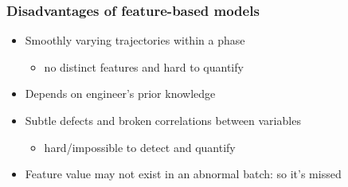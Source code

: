 \begin{frame}\frametitle{Disadvantages of feature-based models}

\begin{itemize}
	\item	Smoothly varying trajectories within a phase
	
			\begin{itemize}
				\item	no distinct features and hard to quantify
			\end{itemize}
			
	
	\item	Depends on engineer's prior knowledge
	
	\item	Subtle defects and broken correlations between variables 
	
			\begin{itemize}
				\item	hard/impossible to detect and quantify
			\end{itemize}
			

	\item	Feature value may not exist in an abnormal batch: so it's missed
	
\end{itemize}
\end{frame}

